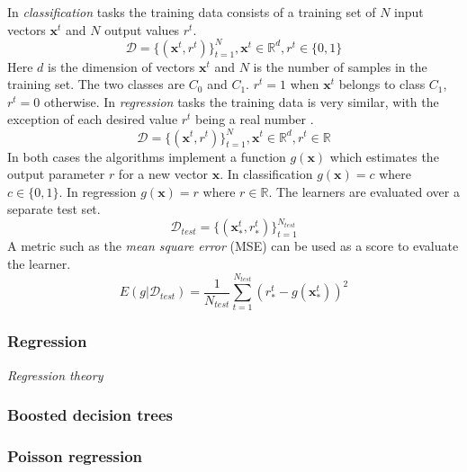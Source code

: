 \documentclass[english,12pt,a4paper,pdftex,sci,utf8]{aaltothesis}
\newcommand{\nyi}[1]{\colorbox{nyibg}{\textcolor{nyitext}{\emph{#1}}}}
\begin{document}
In \emph{classification} tasks the training data consists of a training set of $N$ input vectors $\mathbf{x}^t$ and $N$ output values $r^t$.
$$\mathcal{D} = \{(\mathbf{x}^t, r^t)\}_{t=1}^N, \mathbf{x}^t \in \mathbb{R}^d, r^t \in \{0, 1\} $$
Here $d$ is the dimension of vectors $\mathbf{x}^t$ and $N$ is the number of samples in the training set.
The two classes are $C_0$ and $C_1$. $r^t = 1$ when $\mathbf{x}^t$ belongs to class $C_1$, $r^t = 0$ otherwise. \cite{alpaydin}
In \emph{regression} tasks the training data is very similar, with the exception of each desired value $r^t$ being a real number \cite{alpaydin}.
$$\mathcal{D} = \{(\mathbf{x}^t, r^t)\}_{t=1}^N, \mathbf{x}^t \in \mathbb{R}^d, r^t \in \mathbb{R}$$
In both cases the algorithms implement a function $g(\mathbf{x})$ which estimates the output parameter $r$ for a new vector $\mathbf{x}$. 
In classification $g(\mathbf{x}) = c$ where $c \in \{0, 1\}$. 
In regression $g(\mathbf{x}) = r$ where $r \in \mathbb{R}$.
The learners are evaluated over a separate test set.
$$\mathcal{D}_{test} = \{ (\mathbf{x}_*^t , r_*^t) \}_{t=1}^{N_{test}}$$
A metric such as the \emph{mean square error} (MSE) can be used as a score to evaluate the learner. \cite{alpaydin}
$$E(g | \mathcal{D}_{test}) = \frac{1}{N_{test}} \sum_{t=1}^{N_{test}} (r_*^t - g(\mathbf{x}_*^t))^2$$

\subsubsection{Regression}

\nyi{Regression theory}



\subsubsection{Boosted decision trees}




\subsubsection{Poisson regression}


\end{document}
